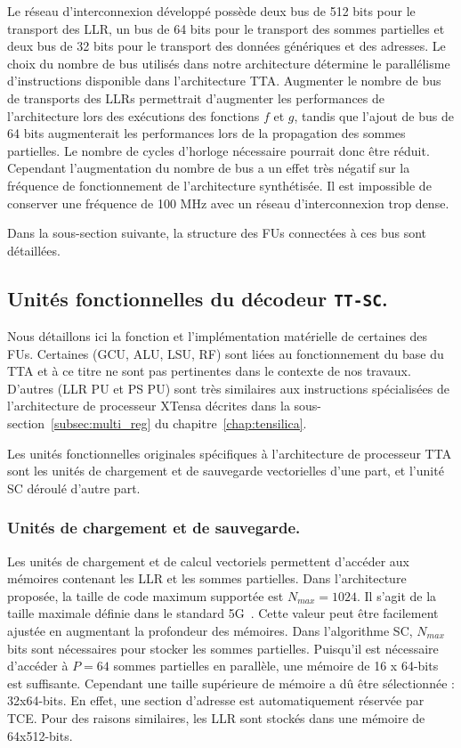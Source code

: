 Le réseau d'interconnexion développé possède deux bus de 512 bits pour le transport des LLR, un bus de 64 bits pour le transport des sommes partielles et deux bus de 32 bits pour le transport des données génériques et des adresses. Le choix du nombre de bus utilisés dans notre architecture détermine le parallélisme d'instructions disponible dans l'architecture TTA. Augmenter le nombre de bus de transports des LLRs permettrait d'augmenter les performances de l'architecture lors des exécutions des fonctions $f$ et $g$, tandis que l'ajout de bus de 64 bits augmenterait les performances lors de la propagation des sommes partielles. Le nombre de cycles d'horloge nécessaire pourrait donc être réduit. Cependant l'augmentation du nombre de bus a un effet très négatif sur la fréquence de fonctionnement de l'architecture synthétisée. Il est impossible de conserver une fréquence de 100 MHz avec un réseau d'interconnexion trop dense.

Dans la sous-section suivante, la structure des FUs connectées à ces bus sont détaillées.

\subsection{Unités fonctionnelles du décodeur \texttt{TT-SC}.}
Nous détaillons ici la fonction et l'implémentation matérielle de certaines des FUs. Certaines (GCU, ALU, LSU, RF) sont liées au fonctionnement du base du TTA et à ce titre ne sont pas pertinentes dans le contexte de nos travaux. D'autres (LLR PU et PS PU) sont très similaires aux instructions spécialisées de l'architecture de processeur XTensa décrites dans la sous-section~\ref{subsec:multi_reg} du chapitre~\ref{chap:tensilica}.

Les unités fonctionnelles originales spécifiques à l'architecture de processeur TTA sont les unités de chargement et de sauvegarde vectorielles d'une part, et l'unité \og SC déroulé \fg d'autre part.

\subsubsection{Unités de chargement et de sauvegarde.}

Les unités de chargement et de calcul vectoriels permettent d'accéder aux mémoires contenant les LLR et les sommes partielles. Dans l'architecture proposée, la taille de code maximum supportée est $N_{max}=1024$. Il s'agit de la taille maximale définie dans le standard 5G~\cite{3gpp_ts_2017}. Cette valeur peut être facilement ajustée en augmentant la profondeur des mémoires. Dans l'algorithme SC, $N_{max}$ bits sont nécessaires pour stocker les sommes partielles. Puisqu'il est nécessaire d'accéder à $P=64$ sommes partielles en parallèle, une mémoire de 16 x 64-bits est suffisante. Cependant une taille supérieure de mémoire a dû être sélectionnée : 32x64-bits. En effet, une section d'adresse est automatiquement réservée par TCE. Pour des raisons similaires, les LLR sont stockés dans une mémoire de 64x512-bits.

